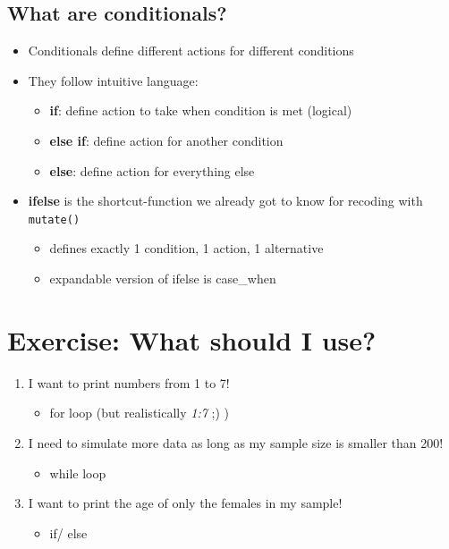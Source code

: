 \documentclass[
]{book}
\providecommand{\tightlist}{%
  \setlength{\itemsep}{0pt}\setlength{\parskip}{0pt}}
\begin{document}
\subsection{What are conditionals?}\label{what-are-conditionals}

\begin{itemize}
\tightlist
\item
  Conditionals define different actions for different conditions
\item
  They follow intuitive language:

  \begin{itemize}
  \tightlist
  \item
    \textbf{if}: define action to take when condition is met (logical)
  \item
    \textbf{else if}: define action for another condition
  \item
    \textbf{else}: define action for everything else
  \end{itemize}
\item
  \textbf{ifelse} is the shortcut-function we already got to know for recoding with \texttt{mutate()}

  \begin{itemize}
  \tightlist
  \item
    defines exactly 1 condition, 1 action, 1 alternative
  \item
    expandable version of ifelse is case\_when
  \end{itemize}
\end{itemize}

\section{Exercise: What should I use?}\label{exercise-what-should-i-use}

\begin{enumerate}
\def\labelenumi{\arabic{enumi}.}
\tightlist
\item
  I want to print numbers from 1 to 7!

  \begin{itemize}
  \tightlist
  \item
    for loop (but realistically \emph{1:7} ;) )
  \end{itemize}
\item
  I need to simulate more data as long as my sample size is smaller than 200!

  \begin{itemize}
  \tightlist
  \item
    while loop
  \end{itemize}
\item
  I want to print the age of only the females in my sample!

  \begin{itemize}
  \tightlist
  \item
    if/ else
  \end{itemize}
\end{enumerate}
\end{document}
